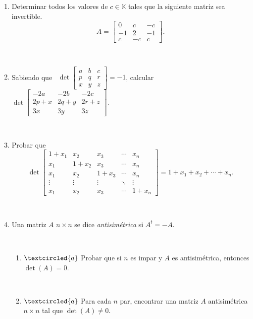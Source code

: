 \documentclass[a4paper,12pt,twoside,spanish,reqno]{amsbook}
\numberwithin{equation}{section}
\renewcommand{\sin}{{\,\operatorname{sen}}}
\begin{document}
\begin{enumerate}[resume]
\item Determinar todos los valores de $c\in\mathbb{K}$ tales que la siguiente matriz sea invertible.
$$A=\begin{bmatrix} 0&c&-c\\ -1&2&-1\\c&-c&c\end{bmatrix}.$$

%		

\

\item Sabiendo que \
$
\det \begin{bmatrix} a&b&c\\ p&q&r\\
x&y&z\end{bmatrix}=-1
$,
calcular \
$
\det \begin{bmatrix} -2a&-2b&-2c\\ 2p+x&2q+y&2r+z\\
3x&3y&3z\end{bmatrix}.
$

\

\item Probar que
$$
\det\begin{bmatrix}
1+x_1 & x_2 & x_3 & \cdots & x_n \\
x_1 & 1+x_2 & x_3 & \cdots & x_n \\
x_1 & x_2 & 1+x_3 & \cdots & x_n \\
\vdots & \vdots & \vdots &\ddots& \vdots \\
x_1 & x_2 & x_3 & \cdots & 1+x_n
\end{bmatrix}
= 1+x_1+x_2 + \cdots + x_n.
$$

\

\item
Una matriz $A$ $n \times n$ se dice {\it antisimétrica}
si $A^t=-A$.

\

\begin{enumerate}
\item\label{anti a} $\textcircled{a}$ Probar que si $n$ es impar y $A$ es antisimétrica, entonces
$\det(A)=0$.

\

\item\label{anti b} $\textcircled{a}$ Para cada $n$ par, encontrar una matriz $A$ antisimétrica
$n \times n$ tal que $\det(A)\not=0$.
\end{enumerate}
	
	
\end{enumerate}
\end{document}
